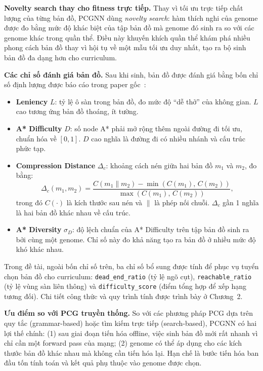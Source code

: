 \textbf{Novelty search thay cho fitness trực tiếp.} Thay vì tối ưu trực tiếp chất lượng của từng bản đồ, PCGNN dùng \textit{novelty search}: hàm thích nghi của genome được đo bằng mức độ khác biệt của tập bản đồ mà genome đó sinh ra so với các genome khác trong quần thể. Điều này khuyến khích quần thể khám phá nhiều phong cách bản đồ thay vì hội tụ về một mẫu tối ưu duy nhất, tạo ra bộ sinh bản đồ đa dạng hơn cho curriculum.

\textbf{Các chỉ số đánh giá bản đồ.} Sau khi sinh, bản đồ được đánh giá bằng bốn chỉ số định lượng được báo cáo trong paper gốc~\cite{Beukman2022}:

\begin{itemize}
    \item \textbf{Leniency} $L$: tỷ lệ ô sàn trong bản đồ, đo mức độ ``dễ thở'' của không gian. $L$ cao tương ứng bản đồ thoáng, ít tường.
    \item \textbf{A* Difficulty} $D$: số node A* phải mở rộng thêm ngoài đường đi tối ưu, chuẩn hóa về $[0,1]$. $D$ cao nghĩa là đường đi có nhiều nhánh và cấu trúc phức tạp.
    \item \textbf{Compression Distance} $\Delta_c$: khoảng cách nén giữa hai bản đồ $m_1$ và $m_2$, đo bằng:
        \begin{equation}
            \Delta_c(m_1, m_2) = \frac{C(m_1 \| m_2) - \min(C(m_1),\, C(m_2))}{\max(C(m_1),\, C(m_2))},
            \label{eq:ncd}
        \end{equation}
        trong đó $C(\cdot)$ là kích thước sau nén và $\|$ là phép nối chuỗi. $\Delta_c$ gần 1 nghĩa là hai bản đồ khác nhau về cấu trúc.
    \item \textbf{A* Diversity} $\sigma_D$: độ lệch chuẩn của A* Difficulty trên tập bản đồ sinh ra bởi cùng một genome. Chỉ số này đo khả năng tạo ra bản đồ ở nhiều mức độ khó khác nhau.
\end{itemize}

Trong đề tài, ngoài bốn chỉ số trên, ba chỉ số bổ sung được tính để phục vụ tuyển chọn bản đồ cho curriculum: \texttt{dead\_end\_ratio} (tỷ lệ ngõ cụt), \texttt{reachable\_ratio} (tỷ lệ vùng sàn liên thông) và \texttt{difficulty\_score} (điểm tổng hợp để xếp hạng tương đối). Chi tiết công thức và quy trình tính được trình bày ở Chương~2.

\textbf{Ưu điểm so với PCG truyền thống.} So với các phương pháp PCG dựa trên quy tắc (grammar-based) hoặc tìm kiếm trực tiếp (search-based), PCGNN có hai lợi thế chính: (1) sau giai đoạn tiến hóa offline, việc sinh bản đồ mới rất nhanh vì chỉ cần một forward pass của mạng; (2) genome có thể áp dụng cho các kích thước bản đồ khác nhau mà không cần tiến hóa lại. Hạn chế là bước tiến hóa ban đầu tốn tính toán và kết quả phụ thuộc vào genome được chọn.

